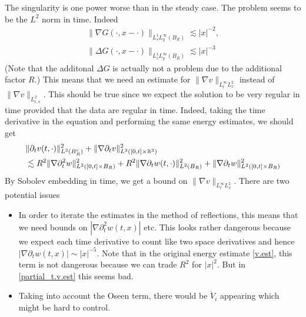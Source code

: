 \documentclass[abstracton, paper=a4, fontsize=11pt,DIV=12,bibliography=totoc]{scrartcl}
\begin{document}
The singularity is one power worse than in the steady case. 
The problem seems to be the $L^2$ norm in time. Indeed
\begin{align*}
    \|\nabla G(\cdot,x-\cdot)\|_{L^1_s L^\infty_y(B_R)} \lesssim |x|^{-2}, \\
    \|\Delta G(\cdot,x-\cdot)\|_{L^1_s L^\infty_y(B_R)} \lesssim  |x|^{-3}
\end{align*}
(Note that the additonal $\Delta G$ is actually not a problem due to the additional factor $R$.)
This means that we need an estimate for $\|\nabla v\|_{L^\infty_{t} L^2_x}$ instead of $\|\nabla v\|_{L^2_{t,x}}$. 
This should be true since we expect the solution to be very regular in time provided that the data are regular in time.
Indeed, taking the time derivative in the equation and performing the same energy estimates, we should get
\begin{align} \label{partial_t.v.est}
       & \|\partial_t v(t,\cdot)\|_{L^2(B_R^c)}^2  + \|\nabla  \partial_t v\|_{L^2([0,t] \times \mathbb{R}^3)}^2 \\
       &\lesssim R^2 \|\nabla  \partial^2_t w\|_{L^2([0,t]\times B_R)}^2 + R^2 \|\nabla \partial_t w(t,\cdot)\|_{L^2(B_R)}^2  + \|\nabla  \partial_t w\|_{L^2([0,t] \times  B_R)}^2
\end{align}
By Sobolev embedding in time, we get a bound on $\|\nabla v\|_{L^\infty_{t} L^2_x}$. 
There are two potential issues
\begin{itemize}
    \item In order to iterate the estimates in the method of reflections, this means that we need bounds on $|\nabla  \partial^2_t w(t,x)|$ etc. This looks rather dangerous because we expect each time derivative to count like two space derivatives and hence $|\nabla  \partial_t w(t,x)| \sim |x|^{-5}$. Note that in the original energy estimate \eqref{v.est}, this term is not dangerous because we can trade $R^2$ for $|x|^2$. But in  \eqref{partial_t.v.est} this seems bad.
    \item Taking into account the Oseen term, there would be $\dot V_i$ appearing which might be hard to control.
\end{itemize}
\end{document}
